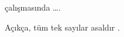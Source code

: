 \documentclass{article}
\begin{document}
\citet{Brooks1997Methodology}
çalışmasında \ldots. 

Açıkça, tüm tek sayılar asaldır
\citep{Jacobson1999Towards}.

 


\end{document}
